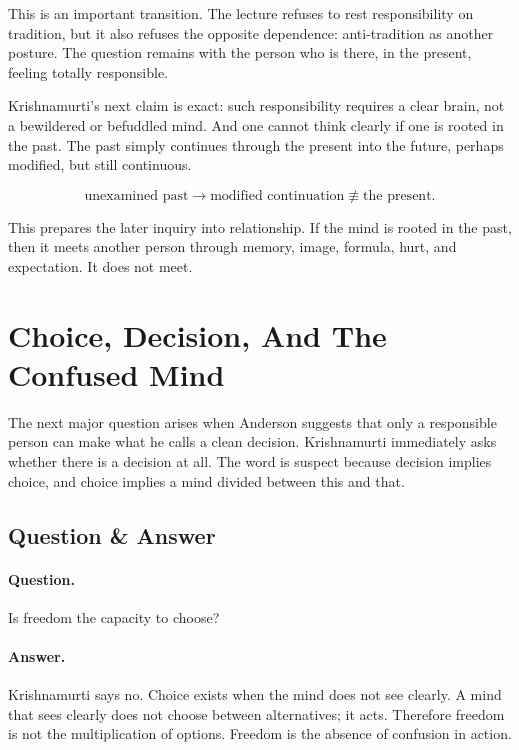 This is an important transition. The lecture refuses to rest responsibility on tradition, but it also refuses the opposite dependence: anti-tradition as another posture. The question remains with the person who is there, in the present, feeling totally responsible.

Krishnamurti's next claim is exact: such responsibility requires a clear brain, not a bewildered or befuddled mind. And one cannot think clearly if one is rooted in the past. The past simply continues through the present into the future, perhaps modified, but still continuous.

\begin{equation}
\text{unexamined past}
\longrightarrow
\text{modified continuation}
\not\equiv
\text{the present}.
\end{equation}

This prepares the later inquiry into relationship. If the mind is rooted in the past, then it meets another person through memory, image, formula, hurt, and expectation. It does not meet.

\section{Choice, Decision, And The Confused Mind}

The next major question arises when Anderson suggests that only a responsible person can make what he calls a clean decision. Krishnamurti immediately asks whether there is a decision at all. The word is suspect because decision implies choice, and choice implies a mind divided between this and that.

\subsection{Question \& Answer}

\paragraph{Question.}
Is freedom the capacity to choose?

\paragraph{Answer.}
Krishnamurti says no. Choice exists when the mind does not see clearly. A mind that sees clearly does not choose between alternatives; it acts. Therefore freedom is not the multiplication of options. Freedom is the absence of confusion in action.

